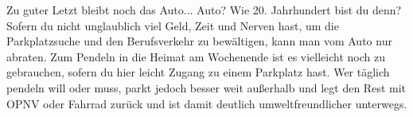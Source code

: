 
Zu guter Letzt bleibt noch das Auto... Auto? Wie 20. Jahrhundert bist du denn? Sofern du nicht unglaublich viel Geld, Zeit und Nerven hast, um die Parkplatzsuche und den Berufsverkehr zu bewältigen, kann man vom Auto nur abraten. Zum Pendeln in die Heimat am Wochenende ist es vielleicht noch zu gebrauchen, sofern du hier leicht Zugang zu einem Parkplatz hast. Wer täglich pendeln will oder muss, parkt jedoch besser weit außerhalb und legt den Rest mit OPNV oder Fahrrad zurück und ist damit deutlich umweltfreundlicher unterwegs.
